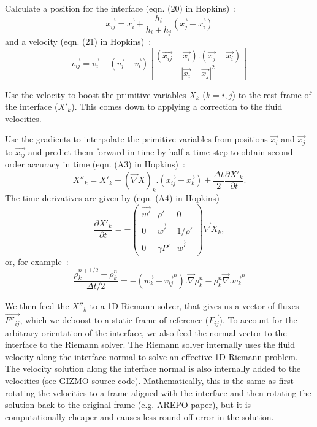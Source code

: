 Calculate a position for the interface (eqn. (20) in Hopkins)~:
\begin{equation}
	\vec{x_{ij}} = \vec{x_i} + \frac{h_i}{h_i+h_j} (\vec{x_j} - \vec{x_i})
\end{equation}
and a velocity (eqn. (21) in Hopkins)~:
\begin{equation}
	\vec{v_{ij}} = \vec{v_i} + (\vec{v_j}-\vec{v_i})\left[ \frac{(\vec{x_{ij}}-\vec{x_i}).(\vec{x_j}-\vec{x_i})}{|\vec{x_i}-\vec{x_j}|^2} \right]
\end{equation}

Use the velocity to boost the primitive variables $X_k$ ($k=i,j$) to the rest frame of the interface ($X'_k$). This comes down to applying a correction to the fluid velocities.

Use the gradients to interpolate the primitive variables from positions $\vec{x_i}$ and $\vec{x_j}$ to $\vec{x_{ij}}$ and predict them forward in time
by half a time step to obtain second order accuracy in time (eqn. (A3) in Hopkins)~:
\begin{equation}
	X''_k = X'_k + \left(\vec{\nabla}X\right)_k.(\vec{x_{ij}}-\vec{x_k}) + \frac{\Delta t}{2} \frac{\partial X'_k}{\partial t}.
\end{equation}
The time derivatives are given by (eqn. (A4) in Hopkins)
\begin{equation}
	\frac{\partial X'_k}{\partial t} = -\begin{pmatrix}
	\vec{w'} & \rho' & 0\\
	0 & \vec{w'} & 1/\rho'\\
	0 & \gamma P' & \vec{w'}
	\end{pmatrix} \vec{\nabla}X_k, \label{eq:euler_primitive}
\end{equation}
or, for example~:
\begin{equation}
	\frac{\rho_k^{n+1/2}-\rho_k^n}{\Delta t/2} = -\left( \vec{w_k}-\vec{v_{ij}}^n \right).\vec{\nabla}\rho_k^n - \rho_k^n \vec{\nabla}.\vec{w_k}^n
\end{equation}

We then feed the $X''_k$ to a 1D Riemann solver, that gives us a vector of fluxes $\vec{F''_{ij}}$, which we deboost to a static frame of reference ($\vec{F_{ij}}$). To account for the arbitrary orientation of the interface, we also feed the normal vector to the interface to the Riemann solver. The Riemann solver internally uses the fluid velocity along the interface normal to solve an effective 1D Riemann problem. The velocity solution along the interface normal is also internally added to the velocities (see GIZMO source code). Mathematically, this is the same as first rotating the velocities to a frame aligned with the interface and then rotating the solution back to the original frame (e.g. AREPO paper), but it is computationally cheaper and causes less round off error in the solution.

